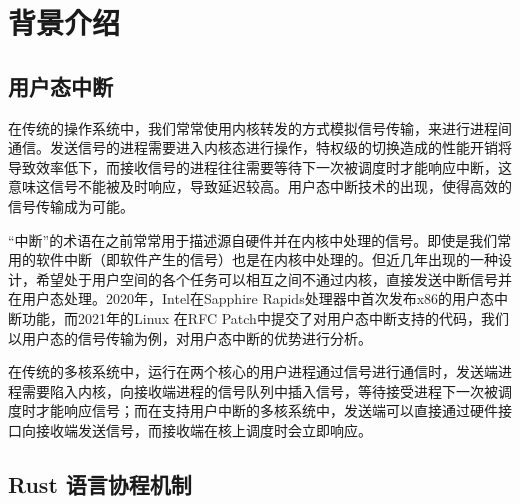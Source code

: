 \section{背景介绍}

\subsection{用户态中断}

在传统的操作系统中，我们常常使用内核转发的方式模拟信号传输，来进行进程间通信。发送信号的进程需要进入内核态进行操作，特权级的切换造成的性能开销将导致效率低下，而接收信号的进程往往需要等待下一次被调度时才能响应中断，这意味这信号不能被及时响应，导致延迟较高。用户态中断技术的出现，使得高效的信号传输成为可能。

“中断”的术语在之前常常用于描述源自硬件并在内核中处理的信号。即使是我们常用的软件中断（即软件产生的信号）也是在内核中处理的。但近几年出现的一种设计，希望处于用户空间的各个任务可以相互之间不通过内核，直接发送中断信号并在用户态处理。2020年，Intel在Sapphire Rapids处理器中首次发布x86的用户态中断功能，而2021年的Linux 在RFC Patch中提交了对用户态中断支持的代码，我们以用户态的信号传输为例，对用户态中断的优势进行分析。

在传统的多核系统中，运行在两个核心的用户进程通过信号进行通信时，发送端进程需要陷入内核，向接收端进程的信号队列中插入信号，等待接受进程下一次被调度时才能响应信号；而在支持用户中断的多核系统中，发送端可以直接通过硬件接口向接收端发送信号，而接收端在核上调度时会立即响应。

\subsection{Rust 语言协程机制}